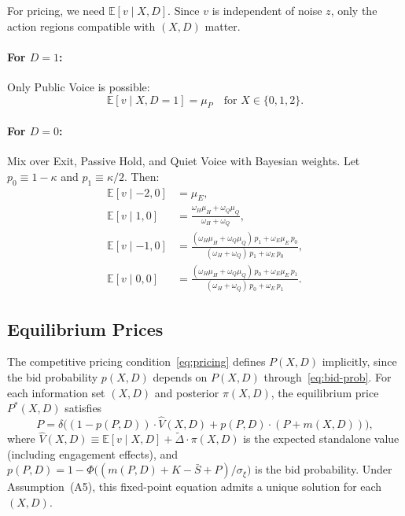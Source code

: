 \documentclass[11pt]{article}
\newcommand{\E}{\mathbb{E}}
\newcommand{\1}{\mathbf{1}}
\begin{document}
For pricing, we need $\E[v \mid X, D]$. Since $v$ is independent of noise $z$, only the action regions compatible with $(X, D)$ matter.

\paragraph{For $D=1$:} Only Public Voice is possible:
\[
\E[v \mid X, D=1] = \mu_P \quad \text{for } X \in \{0, 1, 2\}.
\]

\paragraph{For $D=0$:} Mix over Exit, Passive Hold, and Quiet Voice with Bayesian weights. Let $p_0 \equiv 1 - \kappa$ and $p_1 \equiv \kappa/2$. Then:
\begin{align*}
\E[v \mid -2, 0] &= \mu_E, \\
\E[v \mid 1, 0] &= \frac{\omega_H \mu_H + \omega_Q \mu_Q}{\omega_H + \omega_Q}, \\
\E[v \mid -1, 0] &= \frac{(\omega_H \mu_H + \omega_Q \mu_Q) \, p_1 + \omega_E \mu_E \, p_0}{(\omega_H + \omega_Q) \, p_1 + \omega_E \, p_0}, \\
\E[v \mid 0, 0] &= \frac{(\omega_H \mu_H + \omega_Q \mu_Q) \, p_0 + \omega_E \mu_E \, p_1}{(\omega_H + \omega_Q) \, p_0 + \omega_E \, p_1}.
\end{align*}

\subsection{Equilibrium Prices}
\label{sec:prices}

The competitive pricing condition~\eqref{eq:pricing} defines $P(X,D)$ implicitly, since the bid probability $p(X,D)$ depends on $P(X,D)$ through~\eqref{eq:bid-prob}. For each information set $(X,D)$ and posterior $\pi(X,D)$, the equilibrium price $P^*(X,D)$ satisfies
\begin{equation}
P = \delta\Big((1-p(P,D)) \cdot \hat{V}(X,D) + p(P,D) \cdot (P + m(X,D))\Big),
\label{eq:price-fp}
\end{equation}
where $\hat{V}(X,D) \equiv \E[v \mid X,D] + \tilde{\Delta} \cdot \pi(X,D)$ is the expected standalone value (including engagement effects), and $p(P,D) = 1 - \Phi\big((m(P,D) + K - \bar{S} + P)/\sigma_\xi\big)$ is the bid probability. Under Assumption~\textup{(A5)}, this fixed-point equation admits a unique solution for each $(X,D)$.
\end{document}

